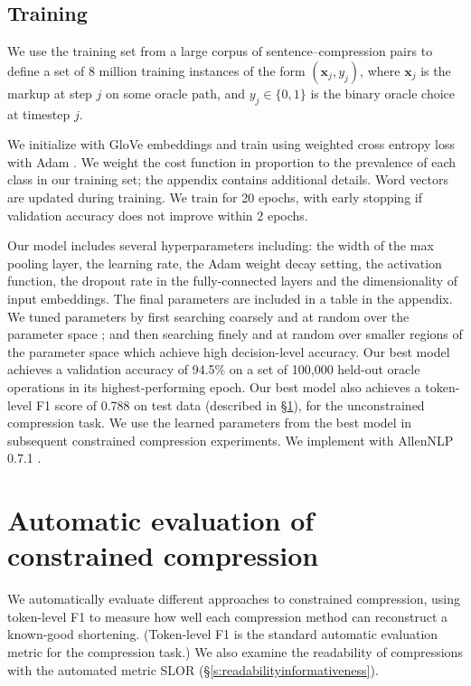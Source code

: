 \documentclass[11pt,a4paper]{article}
\begin{document}
\subsection{Training}

We use the training set from a large corpus of sentence--compression pairs \cite{filippova2013overcoming} to define a set of 8 million training instances of the form $(\bm{x}_j, y_j)$, where $\bm{x}_j$ is the markup at step $j$ on some oracle path, and $y_j \in \{0,1\}$ is the binary oracle choice at timestep $j$.

We initialize with GloVe embeddings \cite{pennington2014glove} and train using weighted cross entropy loss with Adam \cite{Kingma2014AdamAM}. We weight the cost function in proportion to the prevalence of each class in our training set; the appendix contains additional details. Word vectors are updated during training. We train for 20 epochs, with early stopping if validation accuracy does not improve within 2 epochs.

Our model includes several hyperparameters including: the width of the max pooling layer, the learning rate, the Adam weight decay setting, the activation function, the dropout rate in the fully-connected layers and the dimensionality of input embeddings. The final parameters are included in a table in the appendix. We tuned parameters by first searching coarsely and at random over the parameter space \cite{Bergstra2012RandomSF}; and then searching finely and at random over smaller regions of the parameter space which achieve high decision-level accuracy. Our best model achieves a validation accuracy of 94.5\% on a set of 100,000 held-out oracle operations in its highest-performing epoch. Our best model also achieves a token-level F1 score of 0.788 on test data (described in \S\ref{s:autoeval}), for the unconstrained compression task. We use the learned parameters from the best model in subsequent constrained compression experiments. We implement with AllenNLP 0.7.1 \cite{Gardner2017AllenNLP}.

\section{Automatic evaluation of constrained compression}\label{s:autoeval}

We automatically evaluate different approaches to constrained compression, using token-level F1 to measure how well each compression method can reconstruct a known-good shortening. (Token-level F1 is the standard automatic evaluation metric for the compression task.) We also examine the readability of compressions with the automated metric SLOR (\S\ref{s:readabilityinformativeness}). 
\end{document}
